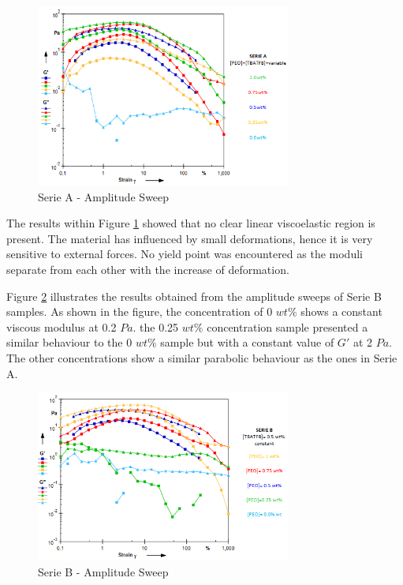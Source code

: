 \begin{figure}[th]
\centering
\includegraphics[width=0.75\textwidth]{./Figures/SerieAampSweep.png}
\decoRule
\caption[Serie A - Amplitude Sweep]{Serie A - Amplitude Sweep \cite{Flores2017}}
\label{fig:SerieAampSweep}
\end{figure}

The results within Figure \ref{fig:SerieAampSweep} showed that no clear linear viscoelastic region is present. The material has influenced by small deformations, hence it is very sensitive to external forces. No yield point was encountered as the moduli separate from each other with the increase of deformation.

Figure \ref{fig:SerieBampSweep} illustrates the results obtained from the amplitude sweeps of Serie B samples. As shown in the figure, the concentration of 0 $w t \%$ shows a constant viscous modulus at 0.2 $Pa$. the 0.25 $w t \%$ concentration sample presented a similar behaviour to the 0 $w t \%$ sample but with a constant value of $G'$ at 2 $Pa$. The other concentrations show a similar parabolic behaviour as the ones in Serie A.

\begin{figure}[th]
\centering
\includegraphics[width=0.75\textwidth]{./Figures/SerieBampSweep.png}
\decoRule
\caption[Serie B - Amplitude Sweep]{Serie B - Amplitude Sweep \cite{Flores2017}}
\label{fig:SerieBampSweep}
\end{figure}

